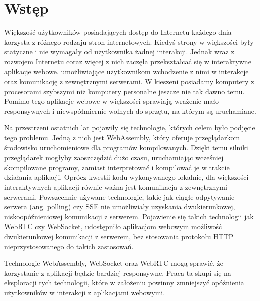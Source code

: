 \documentclass[language=polish,type=master]{aghmodern}
\author{Piotr Szczygieł}
\date{2022}
\begin{document}
\frontmatter
\maketitle

\setcounter{tocdepth}{1}
\tableofcontents

\mainmatter

\onehalfspacing

\chapter{Wstęp}
Większość użytkowników posiadających dostęp do Internetu każdego dnia korzysta z różnego rodzaju stron internetowych.
Kiedyś strony w większości były statyczne i nie wymagały od użytkownika żadnej interakcji.
Jednak wraz z rozwojem Internetu coraz więcej z nich zaczęła przekształcać się w interaktywne aplikacje webowe, umożliwiające użytkownikom wchodzenie z nimi w interakcje oraz komunikację z zewnętrznymi serwerami.
W kieszeni posiadamy komputery z procesorami szybszymi niż komputery personalne jeszcze nie tak dawno temu.
Pomimo tego aplikacje webowe w większości sprawiają wrażenie mało responsywnych i niewspółmiernie wolnych do sprzętu, na którym są uruchamiane.

Na przestrzeni ostatnich lat pojawiły się technologie, których celem było podjęcie tego problemu.
Jedną z nich jest WebAssembly, który oferuje przeglądarkom środowisko uruchomieniowe dla programów kompilowanych.
Dzięki temu silniki przeglądarek mogłyby zaoszczędzić dużo czasu, uruchamiając wcześniej skompilowane programy, zamiast interpretować i kompilować je w trakcie działania aplikacji.
Oprócz kwestii kodu wykonywanego lokalnie, dla większości interaktywnych aplikacji równie ważna jest komunikacja z zewnętrznymi serwerami.
Powszechnie używane technologie, takie jak ciągłe odpytywanie serwera (ang. polling) czy SSE\footnotemark{} nie umożliwiały uzyskania dwukierunkowej, niskoopóźnieniowej komunikacji z serwerem.
Pojawienie się takich technologii jak WebRTC czy WebSocket, udostępniło aplikacjom webowym możliwość dwukierunkowej komunikacji z serwerem, bez stosowania protokołu HTTP nieprzystosowanego do takich zastosowań.

Technologie WebAssembly, WebSocket oraz WebRTC mogą sprawić, że korzystanie z aplikacji będzie bardziej responsywne.
Praca ta skupi się na eksploracji tych technologii, które w założeniu powinny zmniejszyć opóźnienia użytkowników w interakcji z aplikacjami webowymi.
\end{document}
